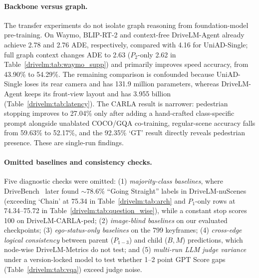 \paragraph{Backbone versus graph.}
The transfer experiments do not isolate graph reasoning from foundation-model pre-training. On Waymo, BLIP-RT-2 and context-free DriveLM-Agent already achieve 2.78 and 2.76 ADE, respectively, compared with 4.16 for UniAD-Single; full graph context changes ADE to 2.63 ($P_2$-only 2.62 in Table~\ref{drivelm:tab:waymo_supp}) and primarily improves speed accuracy, from 43.90\% to 54.29\%. The remaining comparison is confounded because UniAD-Single loses its rear camera and has 131.9 million parameters, whereas DriveLM-Agent keeps its front-view layout and has 3.955 billion (Table~\ref{drivelm:tab:latency}). The CARLA result is narrower: pedestrian stopping improves to 27.04\% only after adding a hand-crafted class-specific prompt alongside unablated COCO/GQA co-training, regular-scene accuracy falls from 59.63\% to 52.17\%, and the 92.35\% `GT' result directly reveals pedestrian presence. These are single-run findings.

\paragraph{Omitted baselines and consistency checks.}
Five diagnostic checks were omitted: (1) \emph{majority-class baselines}, where DriveBench~\cite{xie2025vlms} later found $\sim$78.6\% ``Going Straight'' labels in DriveLM-nuScenes (exceeding `Chain' at 75.34 in Table~\ref{drivelm:tab:arch} and $P_1$-only rows at 74.34--75.72 in Table~\ref{drivelm:tab:question_wise}), while a constant stop scores 100 on DriveLM-CARLA-ped; (2) \emph{image-blind baselines} on our evaluated checkpoints; (3) \emph{ego-status-only baselines} on the 799 keyframes; (4) \emph{cross-edge logical consistency} between parent ($P_{1-3}$) and child ($B, M$) predictions, which node-wise DriveLM-Metrics do not test; and (5) \emph{multi-run LLM judge variance} under a version-locked model to test whether 1--2 point GPT Score gaps (Table~\ref{drivelm:tab:vqa}) exceed judge noise.

